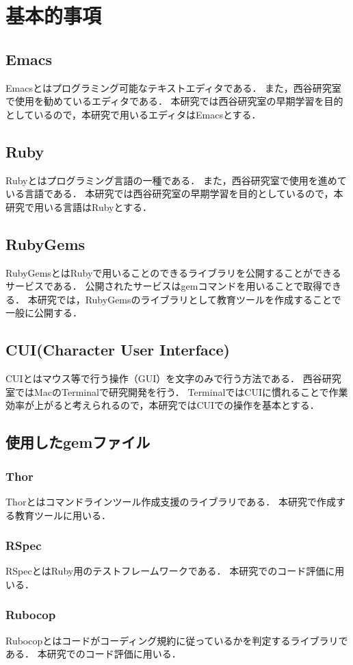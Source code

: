 \chapter{基本的事項}\label{ux57faux672cux7684ux4e8bux9805}

\section{Emacs}\label{emacs}
Emacsとはプログラミング可能なテキストエディタである．
また，西谷研究室で使用を勧めているエディタである．
本研究では西谷研究室の早期学習を目的としているので，本研究で用いるエディタはEmacsとする．

\section{Ruby}\label{ruby}
Rubyとはプログラミング言語の一種である．
また，西谷研究室で使用を進めている言語である．
本研究では西谷研究室の早期学習を目的としているので，本研究で用いる言語はRubyとする．

\section{RubyGems}\label{rubygems}
RubyGemsとはRubyで用いることのできるライブラリを公開することができるサービスである．
公開されたサービスはgemコマンドを用いることで取得できる．
本研究では，RubyGemsのライブラリとして教育ツールを作成することで一般に公開する．

\section{CUI(Character User Interface)}\label{cui}
CUIとはマウス等で行う操作（GUI）を文字のみで行う方法である．
西谷研究室ではMacのTerminalで研究開発を行う．
TerminalではCUIに慣れることで作業効率が上がると考えられるので，本研究ではCUIでの操作を基本とする．

\section{使用したgemファイル}\label{ux4f7fux7528ux3057ux305fgemux30d5ux30a1ux30a4ux30eb}
\subsection{Thor}\label{thor}
Thorとはコマンドラインツール作成支援のライブラリである．
本研究で作成する教育ツールに用いる．

\subsection{RSpec}\label{rspec}
RSpecとはRuby用のテストフレームワークである．
本研究でのコード評価に用いる．

\subsection{Rubocop}\label{rubocop}
Rubocopとはコードがコーディング規約に従っているかを判定するライブラリである．
本研究でのコード評価に用いる．
